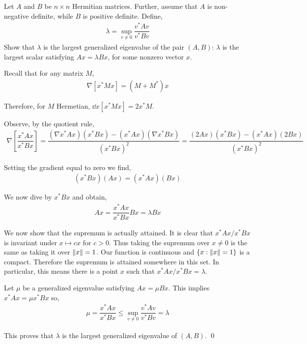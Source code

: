 \documentclass[10pt]{article}
\begin{document}
\begin{problem}
Let \( A \) and \( B \) be \( n\times n \) Hermitian matrices. Further, assume that \( A \) is non-negative definite, while \( B \) is positive definite. Define,
\begin{align*}
    \lambda = \sup_{v\neq 0} \dfrac{v^*Av}{v^*Bv}
\end{align*}
Show that \( \lambda \) is the largest generalized eigenvalue of the pair \((A, B)\): \( \lambda \) is the largest scalar satisfying \( Ax = \lambda Bx \), for some nonzero vector \( x \).
\end{problem}

\begin{solution}[Solution]
Recall that for any matrix \( M \),
\begin{align*}
    \nabla \left[ x^*Mx \right]
    = (M + M^*)x
\end{align*}

Therefore, for \( M \) Hermetian, \( \dd{}{x} \left[ x^*Mx \right] = 2x^*M \).

Observe, by the quotient rule,
\begin{align*}
    \nabla \left[ \dfrac{x^*Ax}{x^*Bx} \right]
    = \dfrac{ \left(\nabla x^*Ax \right) (x^*Bx) - (x^*Ax) (\nabla x^*Bx ) }{(x^*Bx)^2}
    = \dfrac{(2Ax)(x^*Bx) - (x^*Ax)(2Bx)}{(x^*Bx)^2}
\end{align*}

Setting the gradient equal to zero we find,
\begin{align*}
    (x^*Bx)(Ax) = (x^*Ax)(Bx)
\end{align*}

We now dive by \( x^*Bx \) and obtain,
\begin{align*}
    Ax = \dfrac{x^*Ax}{x^*Bx} Bx = \lambda Bx
\end{align*}

We now show that the supremum is actually attained. It is clear that \( x^*Ax / x^*Bx \) is invariant under \( x \mapsto cx \) for \( c>0 \). Thus taking the supremum over \( x\neq 0 \) is the same as taking it over \( \left\lVert x\right\rVert = 1 \). Our function is continuous and \( \{x : \left\lVert x\right\rVert = 1 \} \) is a compact. Therefore the supremum is attained somewhere in this set. In particular, this means there is a point \( x \) such that \( x^*Ax / x^*Bx = \lambda \).

Let \( \mu \) be a generalized eigenvalue satisfying \( Ax = \mu Bx \). This implies \( x^*Ax = \mu x^*Bx  \) so,
\begin{align*}
     \mu = \dfrac{x^*Ax}{x^*Bx} \leq \sup_{v\neq 0} \dfrac{v^*Av}{v^*Bv} = \lambda
\end{align*}

This proves that \( \lambda \) is the largest generalized eigenvalue of \( (A,B) \). \qed
\end{solution}
\end{document}
